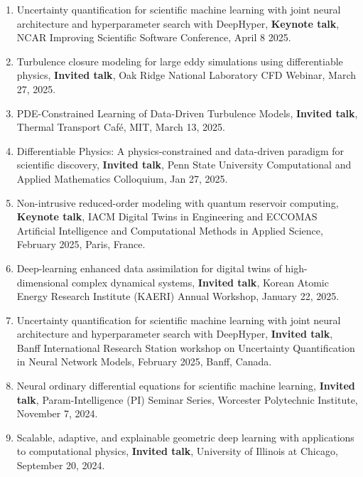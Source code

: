 \documentclass[letterpaper]{article}
\begin{document}
\begin{enumerate}
\item Uncertainty quantification for scientific machine learning with joint neural architecture and hyperparameter search with DeepHyper, \textbf{Keynote talk}, NCAR Improving Scientific Software Conference, April 8 2025.

\item Turbulence closure modeling for large eddy simulations using differentiable physics, \textbf{Invited talk}, Oak Ridge National Laboratory CFD Webinar, March 27, 2025.

\item PDE-Constrained Learning of Data-Driven Turbulence Models, \textbf{Invited talk}, Thermal Transport Caf\'{e}, MIT, March 13, 2025.

\item Differentiable Physics: A physics-constrained and data-driven paradigm for scientific discovery, \textbf{Invited talk}, Penn State University Computational and Applied Mathematics Colloquium, Jan 27, 2025.

\item Non-intrusive reduced-order modeling with quantum reservoir computing, \textbf{Keynote talk}, IACM Digital Twins in Engineering and ECCOMAS Artificial Intelligence and Computational Methods in Applied Science, February 2025, Paris, France.

\item Deep-learning enhanced data assimilation for digital twins of high-dimensional complex dynamical systems, \textbf{Invited talk}, Korean Atomic Energy Research Institute (KAERI) Annual Workshop, January 22, 2025.

\item Uncertainty quantification for scientific machine learning with joint neural architecture and hyperparameter search with DeepHyper, \textbf{Invited talk}, Banff International Research Station workshop on Uncertainty Quantification in Neural Network Models, February 2025, Banff, Canada.

\item Neural ordinary differential equations for scientific machine learning, \textbf{Invited talk}, Param-Intelligence (PI) Seminar Series, Worcester Polytechnic Institute, November 7, 2024.

\item Scalable, adaptive, and explainable geometric deep learning with applications to computational physics, \textbf{Invited talk}, University of Illinois at Chicago, September 20, 2024.


\end{enumerate}
\end{document}
